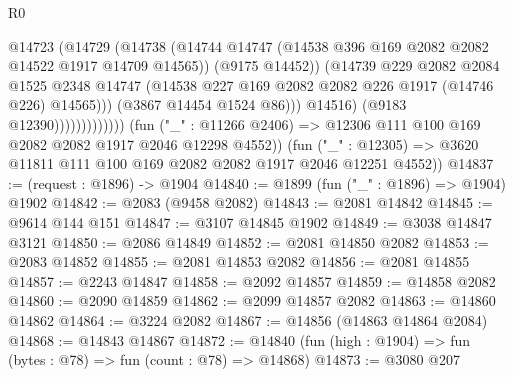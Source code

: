 \begin{lexlean}{R0}
\begin{coremodule}
                                    @14723
                                      (@14729
                                        (@14738
                                          (@14744
                                            @14747
                                            (@14538
                                              @396
                                              @169
                                              @2082
                                              @2082
                                              @14522
                                              @1917
                                              @14709
                                              @14565))
                                          (@9175 @14452))
                                        (@14739
                                          @229
                                          @2082
                                          @2084
                                          @1525
                                          @2348
                                          @14747
                                          (@14538
                                            @227
                                            @169
                                            @2082
                                            @2082
                                            @226
                                            @1917
                                            (@14746 @226)
                                            @14565)))
                                      (@3867 @14454 @1524 @86)))
                                  @14516)
                                (@9183 @12390)))))))))))))
        (fun ("_" : @11266 @2406) => @12306 @111 @100 @169 @2082 @2082 @1917 @2046 @12298 @4552))
      (fun ("_" : @12305) => @3620 @11811 @111 @100 @169 @2082 @2082 @1917 @2046 @12251 @4552))
@14837 := (request : @1896) -> @1904
@14840 := @1899 (fun ("_" : @1896) => @1904) @1902
@14842 := @2083 (@9458 @2082)
@14843 := @2081 @14842
@14845 := @9614 @144 @151
@14847 := @3107 @14845 @1902
@14849 := @3038 @14847 @3121
@14850 := @2086 @14849
@14852 := @2081 @14850 @2082
@14853 := @2083 @14852
@14855 := @2081 @14853 @2082
@14856 := @2081 @14855
@14857 := @2243 @14847
@14858 := @2092 @14857
@14859 := @14858 @2082
@14860 := @2090 @14859
@14862 := @2099 @14857 @2082
@14863 := @14860 @14862
@14864 := @3224 @2082
@14867 := @14856 (@14863 @14864 @2084)
@14868 := @14843 @14867
@14872 := @14840 (fun (high : @1904) => fun (bytes : @78) => fun (count : @78) => @14868)
@14873 := @3080 @207

\end{coremodule}
\end{lexlean}
